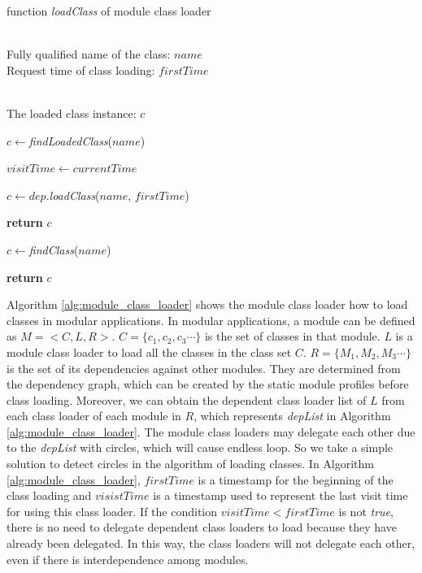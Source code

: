 \documentclass[conference]{IEEEtran}
\begin{document}
\begin{algorithm}[ht]
\caption{function \emph{loadClass} of module class loader}
\label{alg:module_class_loader}
\begin{algorithmic}[1]
\REQUIRE ~~\\
Fully qualified name of the class: $name$ \\
Request time of class loading: $firstTime$

\ENSURE ~~\\
The loaded class instance: $c$

\STATE $c\leftarrow$\emph{findLoadedClass}($name$)


	\STATE $visitTime\leftarrow currentTime$
	
		
		\STATE $c\leftarrow dep.$\emph{loadClass}($name$, $firstTime$)
		
			
			\STATE \textbf{return} $c$

		\ENDIF
	
	\ENDFOR

	\STATE $c\leftarrow$\emph{findClass}($name$)

\ENDIF
	
\STATE \textbf{return} $c$



\end{algorithmic}
\end{algorithm}


Algorithm \ref{alg:module_class_loader} shows the module class loader how to load classes in modular applications.
In modular applications, a module can be defined as $M=<C, L, R>$. 
$C=\{c_1, c_2, c_3\cdots\}$ is the set of classes in that module. 
$L$ is a module class loader to load all the classes in the class set $C$.
$R=\{M_1, M_2, M_3\cdots\}$ is the set of its dependencies against other modules. 
They are determined from the dependency graph, which can be created by the static module profiles before class loading.
Moreover, we can obtain the dependent class loader list of $L$ from each class loader of each module in $R$, which represents \emph{depList} in Algorithm \ref{alg:module_class_loader}. 
The module class loaders may delegate each other due to the \emph{depList} with circles, which will cause endless loop.
So we take a simple solution to detect circles in the algorithm of loading classes.
In Algorithm \ref{alg:module_class_loader}, $firstTime$ is a timestamp for the beginning of the class loading and $visistTime$ is a timestamp used to represent the last visit time for using this class loader. 
If the condition $visitTime < firstTime$ is not \emph{true}, there is no need to delegate dependent class loaders to load because they have already been delegated.
In this way, the class loaders will not delegate each other, even if there is interdependence among modules.
\end{document}
